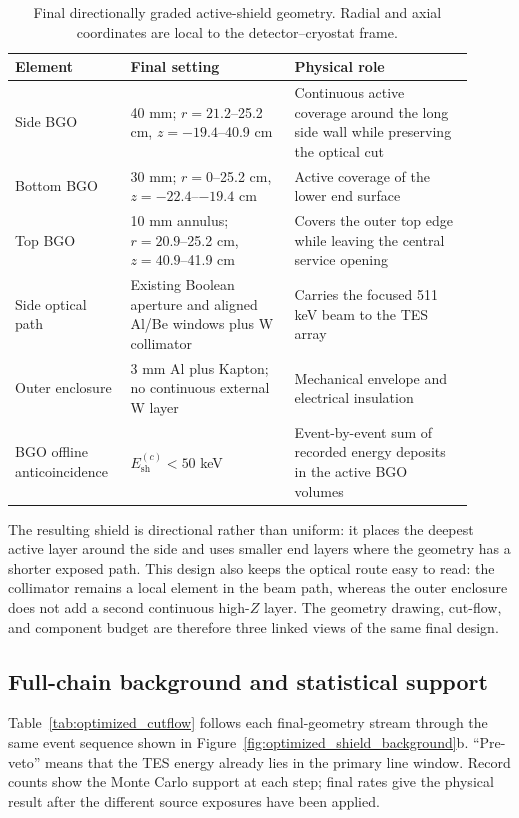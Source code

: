 \documentclass[11pt]{article}
\begin{document}
\begin{table}[!ht]
\centering
\caption{Final directionally graded active-shield geometry. Radial and axial coordinates are local to the detector--cryostat frame.}
\label{tab:final_geometry}
\footnotesize
\begin{tabular}{p{0.22\linewidth}p{0.33\linewidth}p{0.36\linewidth}}
\toprule
Element & Final setting & Physical role \\
\midrule
Side BGO & 40 mm; $r=21.2$--25.2 cm, $z=-19.4$--40.9 cm & Continuous active coverage around the long side wall while preserving the optical cut \\
Bottom BGO & 30 mm; $r=0$--25.2 cm, $z=-22.4$--$-19.4$ cm & Active coverage of the lower end surface \\
Top BGO & 10 mm annulus; $r=20.9$--25.2 cm, $z=40.9$--41.9 cm & Covers the outer top edge while leaving the central service opening \\
Side optical path & Existing Boolean aperture and aligned Al/Be windows plus W collimator & Carries the focused 511 keV beam to the TES array \\
Outer enclosure & 3 mm Al plus Kapton; no continuous external W layer & Mechanical envelope and electrical insulation \\
BGO offline anticoincidence & $E_{\mathrm{sh}}^{(c)}<50$ keV & Event-by-event sum of recorded energy deposits in the active BGO volumes \\
\bottomrule
\end{tabular}
\end{table}

The resulting shield is directional rather than uniform: it places the deepest
active layer around the side and uses smaller end layers where the geometry has a
shorter exposed path. This design also keeps the optical route easy to read: the
collimator remains a local element in the beam path, whereas the outer enclosure
does not add a second continuous high-$Z$ layer. The geometry drawing, cut-flow,
and component budget are therefore three linked views of the same final design.

\FloatBarrier

\subsection{Full-chain background and statistical support}
\label{subsec:optimized_fullchain}

Table~\ref{tab:optimized_cutflow} follows each final-geometry stream through the same event
sequence shown in Figure~\ref{fig:optimized_shield_background}b. ``Pre-veto''
means that the TES energy already lies in the primary line window. Record counts
show the Monte Carlo support at each step; final rates give the physical result
after the different source exposures have been applied.
\end{document}
